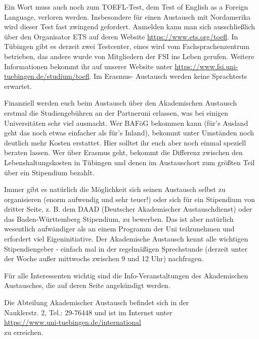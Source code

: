 Ein Wort muss auch noch zum TOEFL-Test, dem Test of English as a Foreign Language, verloren werden. Insbesondere für einen Austausch mit Nordamerika wird dieser Test fast zwingend gefordert. Anmelden kann man sich ausschließlich über den Organisator ETS auf deren Website \url{https://www.ets.org/toefl}. In Tübingen gibt es derzeit zwei Testcenter, eines wird vom Fachsprachenzentrum betrieben, das andere wurde von Mitgliedern der FSI ins Leben gerufen. Weitere Informationen bekommt ihr auf unserer Website unter \url{https://www.fsi.uni-tuebingen.de/studium/toefl}.
Im Erasmus- Austausch werden keine Sprachtests erwartet.

Finanziell werden euch beim Austausch über den Akademischen Austausch erstmal die Studiengebühren an der Partneruni erlassen, was bei einigen Universitäten sehr viel ausmacht.  Wer BAFöG bekommen kann (für's Ausland geht das noch etwas einfacher als für's Inland), bekommt unter Umständen noch deutlich mehr Kosten erstattet. Hier solltet ihr euch aber noch einmal speziell beraten lassen. Wer über Erasmus geht, bekommt die Differenz zwischen den Lebenshaltungskosten in Tübingen und denen im Austauschort zum größten Teil über ein Stipendium bezahlt. 

Immer gibt es natürlich die Möglichkeit sich seinen Austausch selbst zu organisieren (enorm aufwendig und sehr teuer!) oder sich für ein Stipendium von dritter Seite, z. B. dem DAAD (Deutscher Akademischer Austauschdienst) oder das Baden-Württemberg Stipendium, zu bewerben.  Das ist aber natürlich wesentlich aufwändiger als an einem Programm der Uni teilzunehmen und erfordert viel Eigeninitiative. Der Akademische Austausch kennt alle wichtigen Stipendiengeber - einfach mal in der regelmäßigen Sprechstunde (derzeit unter der Woche außer mittwochs zwischen 9 und 12 Uhr) nachfragen.

Für alle Interessenten wichtig sind die Info-Veranstaltungen des Akademischen Austausches, die auf deren Seite angekündigt werden.
\medskip

Die Abteilung Akademischer Austausch befindet sich in der \\
Nauklerstr. 2, Tel.: 29-76448 und ist im Internet unter\\
\url{https://www.uni-tuebingen.de/international}\\
zu erreichen.
